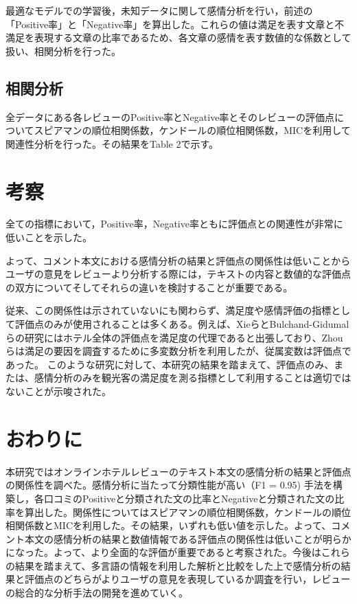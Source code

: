 \documentclass[review]{elsarticle}
\begin{document}
\begin{CJK}{UTF8}{min}


最適なモデルでの学習後，未知データに関して感情分析を行い，前述の「Positive率」と「Negative率」を算出した。これらの値は満足を表す文章と不満足を表現する文章の比率であるため、各文章の感情を表す数値的な係数として扱い、相関分析を行った。


\subsection{相関分析}\label{res_correls}

全データにある各レビューのPositive率とNegative率とそのレビューの評価点についてスピアマンの順位相関係数，ケンドールの順位相関係数，MICを利用して関連性分析を行った。その結果をTable 2で示す。

\section{考察}\label{discussion}

全ての指標において，Positive率，Negative率ともに評価点との関連性が非常に低いことを示した。

よって、コメント本文における感情分析の結果と評価点の関係性は低いことからユーザの意見をレビューより分析する際には，テキストの内容と数値的な評価点の双方についてそしてそれらの違いを検討することが重要である。

従来、この関係性は示されていないにも関わらず、満足度や感情評価の指標として評価点のみが使用されることは多くある。例えば、XieらとBulchand-Gidumalらの研究にはホテル全体の評価点を満足度の代理であると出張しており\cite[][]{XIE20141, BULCHANDGIDUMAL201344}、Zhouらは満足の要因を調査するために多変数分析を利用したが、従属変数は評価点であった\cite[][]{ZHOU20141}。
このような研究に対して、本研究の結果を踏まえて、評価点のみ、または、感情分析のみを観光客の満足度を測る指標として利用することは適切ではないことが示唆された。

\section{おわりに}\label{conclusion}

本研究ではオンラインホテルレビューのテキスト本文の感情分析の結果と評価点の関係性を調べた。感情分析に当たって分類性能が高い（F1 = 0.95) 手法を構築し，各口コミのPositiveと分類された文の比率とNegativeと分類された文の比率を算出した。関係性についてはスピアマンの順位相関係数，ケンドールの順位相関係数とMICを利用した。その結果，いずれも低い値を示した。よって、コメント本文の感情分析の結果と数値情報である評価点の関係性は低いことが明らかになった。よって、より全面的な評価が重要であると考察された。今後はこれらの結果を踏まえて、多言語の情報を利用した解析と比較をした上で感情分析の結果と評価点のどちらがよりユーザの意見を表現しているか調査を行い，レビューの総合的な分析手法の開発を進めていく。


\end{CJK}
\end{document}
